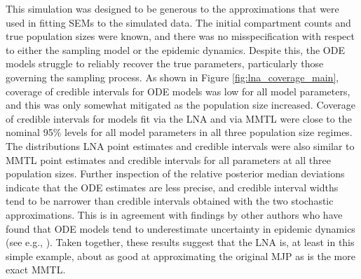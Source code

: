 This simulation was designed to be generous to the approximations that were used in fitting SEMs to the simulated data. The initial compartment counts and true population sizes were known, and there was no misspecification with respect to either the sampling model or the epidemic dynamics. Despite this, the ODE models struggle to reliably recover the true parameters, particularly those governing the sampling process. As shown in Figure \ref{fig:lna_coverage_main}, coverage of credible intervals for ODE models was low for all model parameters, and this was only somewhat mitigated as the population size increased. Coverage of credible intervals for models fit via the LNA and via MMTL were close to the nominal 95\% levels for all model parameters in all three population size regimes. The distributions LNA point estimates and credible intervals were also similar to MMTL point estimates and credible intervals for all parameters at all three population sizes. Further inspection of the relative posterior median deviations indicate that the ODE estimates are less precise, and credible interval widths tend to be narrower than credible intervals obtained with the two stochastic approximations. This is in agreement with findings by other authors who have found that ODE models tend to underestimate uncertainty in epidemic dynamics (see e.g., \cite{king2015avoidable}). Taken together, these results suggest that the LNA is, at least in this simple example, about as good at approximating the original MJP as is the more exact MMTL. 

